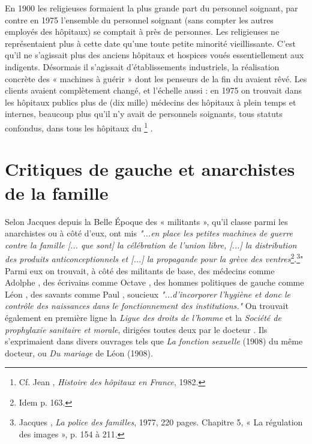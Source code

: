  En 1900 les religieuses formaient la plus grande part du personnel soignant, par contre en 1975 l'ensemble du personnel soignant (sans compter les autres employés des hôpitaux) se comptait à près de  personnes. Les religieuses ne représentaient plus à cette date qu'une toute petite minorité vieillissante. C'est qu'il ne s'agissait plus des anciens hôpitaux et hospices voués essentiellement aux indigents. Désormais il s'agissait d'établissements industriels, la réalisation concrète des « machines à guérir » dont les penseurs de la fin du  avaient rêvé. Les clients avaient complètement changé, et l'échelle aussi : en 1975 on trouvait dans les hôpitaux publics plus de  (dix mille) médecins des hôpitaux à plein temps et  internes, beaucoup plus qu'il n'y avait de personnels soignants, tous statuts confondus, dans tous les hôpitaux du %
\footnote{Cf. Jean , \emph{Histoire des hôpitaux en France}, 1982.}%
.
\section{Critiques de gauche et anarchistes de la famille}

 

Selon Jacques  depuis la Belle Époque des « militants », qu'il classe parmi les anarchistes ou à côté d'eux, ont mis {\emph{"...en place les petites machines de guerre contre la famille \emph{[... que sont]} la célébration de l'union libre, \emph{[...]} la distribution des produits anticonceptionnels et \emph{[...]} la propagande pour la grève des ventres}\footnote{Idem p. 163.}.}\footnote{Jacques , \emph{La police des familles}, 1977, 220 pages. Chapitre 5, « La régulation des images », p. 154 à 211.}" 
Parmi eux on trouvait, à côté des militants de base, des médecins comme Adolphe , des écrivains comme Octave , des hommes politiques de gauche comme Léon , des savants comme Paul , soucieux {\emph{"...d'incorporer l'hygiène et donc le contrôle des naissances dans le fonctionnement des institutions."}} On trouvait également en première ligne la \emph{Ligue des droits de l'homme} et la \emph{Société de prophylaxie sanitaire et morale}, dirigées toutes deux par le docteur . Ils s'exprimaient dans divers ouvrages tels que \emph{La fonction sexuelle} (1908) du même docteur, ou \emph{Du mariage} de Léon  (1908). 

